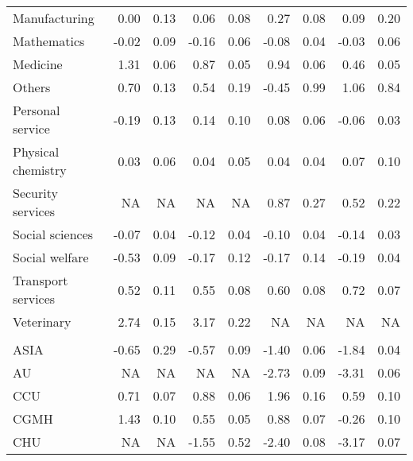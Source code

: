\begin{longtable}[t]{lrrrrrrrr}
\hspace{1em}Manufacturing & 0.00 & 0.13 & 0.06 & 0.08 & 0.27 & 0.08 & 0.09 & 0.20\\
\hspace{1em}Mathematics & -0.02 & 0.09 & -0.16 & 0.06 & -0.08 & 0.04 & -0.03 & 0.06\\
\hspace{1em}Medicine & 1.31 & 0.06 & 0.87 & 0.05 & 0.94 & 0.06 & 0.46 & 0.05\\
\hspace{1em}Others & 0.70 & 0.13 & 0.54 & 0.19 & -0.45 & 0.99 & 1.06 & 0.84\\
\hspace{1em}Personal service & -0.19 & 0.13 & 0.14 & 0.10 & 0.08 & 0.06 & -0.06 & 0.03\\
\hspace{1em}Physical chemistry & 0.03 & 0.06 & 0.04 & 0.05 & 0.04 & 0.04 & 0.07 & 0.10\\
\hspace{1em}Security services & NA & NA & NA & NA & 0.87 & 0.27 & 0.52 & 0.22\\
\hspace{1em}Social sciences & -0.07 & 0.04 & -0.12 & 0.04 & -0.10 & 0.04 & -0.14 & 0.03\\
\hspace{1em}Social welfare & -0.53 & 0.09 & -0.17 & 0.12 & -0.17 & 0.14 & -0.19 & 0.04\\
\hspace{1em}Transport services & 0.52 & 0.11 & 0.55 & 0.08 & 0.60 & 0.08 & 0.72 & 0.07\\
\hspace{1em}Veterinary & 2.74 & 0.15 & 3.17 & 0.22 & NA & NA & NA & NA\\
\addlinespace[0.3em]
\multicolumn{9}{l}{\textit{\textbf{Panel B: }}}\\
\hspace{1em}ASIA & -0.65 & 0.29 & -0.57 & 0.09 & -1.40 & 0.06 & -1.84 & 0.04\\
\hspace{1em}AU & NA & NA & NA & NA & -2.73 & 0.09 & -3.31 & 0.06\\
\hspace{1em}CCU & 0.71 & 0.07 & 0.88 & 0.06 & 1.96 & 0.16 & 0.59 & 0.10\\
\hspace{1em}CGMH & 1.43 & 0.10 & 0.55 & 0.05 & 0.88 & 0.07 & -0.26 & 0.10\\
\hspace{1em}CHU & NA & NA & -1.55 & 0.52 & -2.40 & 0.08 & -3.17 & 0.07\\

\end{longtable}
